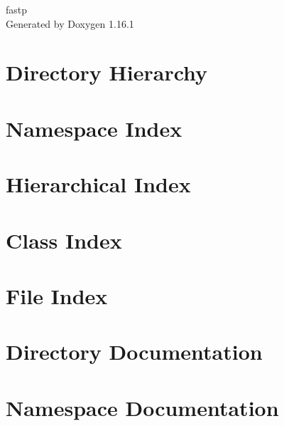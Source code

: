 \documentclass[twoside]{book}
\newcommand{\+}{\discretionary{\mbox{\scriptsize$\hookleftarrow$}}{}{}}
\newcommand{\clearemptydoublepage}{%
    \newpage{\pagestyle{empty}\cleardoublepage}%
  }
\begin{document}
  \raggedbottom
    \hypersetup{pageanchor=false,
                bookmarksnumbered=true,
                pdfencoding=unicode
               }
  \begin{titlepage}
  \vspace*{7cm}
  \begin{center}%
  {\Large fastp}\\
  \vspace*{1cm}
  {\large Generated by Doxygen 1.16.1}\\
  \end{center}
  \end{titlepage}
  \clearemptydoublepage
  \tableofcontents
  \clearemptydoublepage
  \hypersetup{pageanchor=true}
\chapter{Directory Hierarchy}

\chapter{Namespace Index}

\chapter{Hierarchical Index}

\chapter{Class Index}

\chapter{File Index}

\chapter{Directory Documentation}

\chapter{Namespace Documentation}




\end{document}
